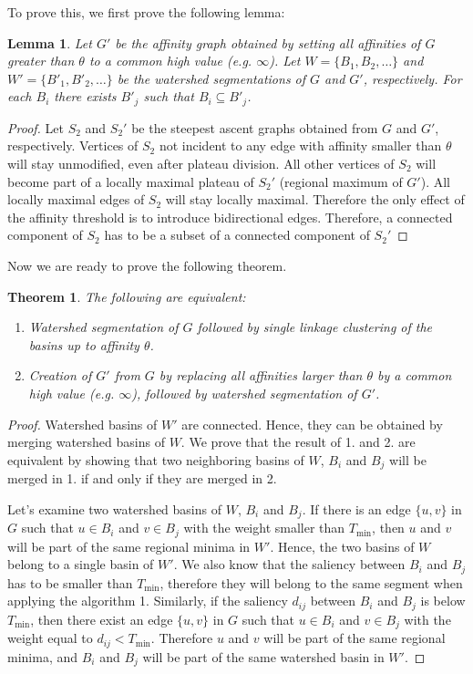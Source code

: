 \documentclass{article}
\newtheorem{lemma}{Lemma}
\newtheorem{theorem}{Theorem}
\begin{document}
To prove this, we first prove the following lemma:
\begin{lemma}
  Let $G'$ be the affinity graph obtained by setting all affinities of
  $G$ greater than $\theta$ to a common high value (e.g. $\infty$).
  Let $W=\{B_1,B_2,\dots\}$ and $W'=\{B'_1,B'_2,\dots\}$ be the
  watershed segmentations of $G$ and $G'$, respectively.  For each
  $B_i$ there exists $B'_j$ such that $B_i \subseteq B'_j$.
\end{lemma}

\begin{proof}
Let $S_2$ and $S_2'$ be the steepest ascent graphs obtained from $G$
and $G'$, respectively.  Vertices of $S_2$ not incident to any edge
with affinity smaller than $\theta$ will stay unmodified, even after
plateau division. All other vertices of $S_2$ will become part of a
locally maximal plateau of $S_2'$ (regional maximum of $G'$). All
locally maximal edges of $S_2$ will stay locally maximal. Therefore
the only effect of the affinity threshold is to introduce
bidirectional edges. Therefore, a connected component of $S_2$ has to
be a subset of a connected component of $S_2'$
\end{proof}

Now we are ready to prove the following theorem.
\begin{theorem}
The following are equivalent:
\begin{enumerate}
\item Watershed segmentation of $G$ followed by single linkage clustering of the basins up to affinity $\theta$.
\item Creation of $G'$ from $G$ by replacing all affinities larger
  than $\theta$ by a common high value (e.g. $\infty$), followed by
  watershed segmentation of $G'$.
\end{enumerate}
\end{theorem}

\begin{proof}
  Watershed basins of $W'$ are connected. Hence, they can be obtained by
merging watershed basins of $W$. We prove that the result of 1. and
2. are equivalent by showing that two neighboring basins of $W$, $B_i$
and $B_j$ will be merged in 1. if and only if they are merged in 2.

Let's examine two watershed basins of $W$, $B_i$ and $B_j$. If there
is an edge $\{u,v\}$ in $G$ such that $u \in B_i$ and $v \in B_j$ with
the weight smaller than $T_{\min}$, then $u$ and $v$ will be part of
the same regional minima in $W'$. Hence, the two basins of $W$ belong
to a single basin of $W'$. We also know that the saliency between
$B_i$ and $B_j$ has to be smaller than $T_{\min}$, therefore they will
belong to the same segment when applying the algorithm 1. Similarly,
if the saliency $d_{ij}$ between $B_i$ and $B_j$ is below $T_{\min}$,
then there exist an edge $\{u,v\}$ in $G$ such that $u \in B_i$ and $v
\in B_j$ with the weight equal to $d_{ij} < T_{\min}$. Therefore $u$
and $v$ will be part of the same regional minima, and $B_i$ and $B_j$
will be part of the same watershed basin in $W'$.
\end{proof}
\end{document}

